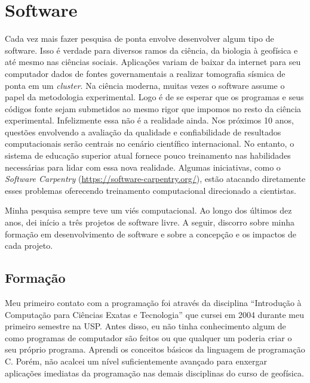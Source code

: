 \section{Software}
\label{software}

Cada vez mais fazer pesquisa de ponta envolve desenvolver algum tipo de
software.
Isso é verdade para diversos ramos da ciência, da biologia à geofísica e até
mesmo nas ciências sociais.
Aplicações variam de baixar da internet para seu computador dados de fontes
governamentais
a realizar tomografia sísmica de ponta em um \textit{cluster}.
Na ciência moderna, muitas vezes o software assume o papel da metodologia
experimental.
Logo é de se esperar que os programas e seus códigos fonte sejam submetidos
ao mesmo rigor que impomos no resto da ciência experimental.
Infelizmente essa não é a realidade ainda.
Nos próximos 10 anos, questões envolvendo a avaliação da qualidade e
confiabilidade de resultados computacionais serão centrais no cenário
científico internacional.
No entanto, o sistema de educação superior atual fornece pouco treinamento nas
habilidades necessárias para lidar com essa nova realidade.
Algumas iniciativas, como o \textit{Software Carpentry}
(\url{https://software-carpentry.org/}), estão atacando diretamente esses
problemas oferecendo treinamento computacional direcionado a cientistas.

Minha pesquisa sempre teve um viés computacional.
Ao longo dos últimos dez anos, dei início a três projetos de software livre.
A seguir, discorro sobre minha formação em desenvolvimento de software e sobre
a concepção e os impactos de cada projeto.


\subsection{Formação}

Meu primeiro contato com a programação foi através da disciplina
``Introdução à Computação para Ciências Exatas e Tecnologia''
que cursei em 2004 durante meu primeiro semestre na USP.
Antes disso, eu não tinha conhecimento algum de como programas de computador
são feitos ou que qualquer um poderia criar o seu próprio programa.
Aprendi os conceitos básicos da linguagem de programação C.
Porém, não acalcei um nível suficientemente avançado para enxergar aplicações
imediatas da programação nas demais disciplinas do curso de geofísica.

